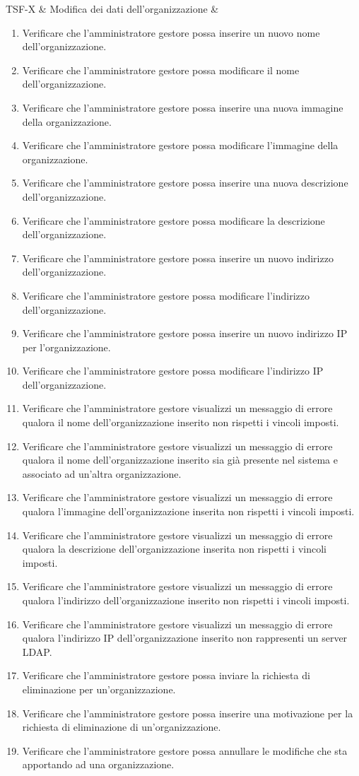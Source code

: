 TSF-X & Modifica dei dati dell'organizzazione & \begin{enumerate}
\item Verificare che l'amministratore gestore possa inserire un nuovo nome dell'organizzazione.
\item Verificare che l'amministratore gestore possa modificare il nome dell'organizzazione.
\item Verificare che l'amministratore gestore possa inserire una nuova immagine della organizzazione.
\item Verificare che l'amministratore gestore possa modificare l'immagine della organizzazione.
\item Verificare che l'amministratore gestore possa inserire una nuova descrizione dell’organizzazione.
\item Verificare che l'amministratore gestore possa modificare la descrizione dell’organizzazione.
\item Verificare che l'amministratore gestore possa inserire un nuovo indirizzo dell’organizzazione.
\item Verificare che l'amministratore gestore possa modificare l'indirizzo dell’organizzazione.
\item Verificare che l'amministratore gestore possa inserire un nuovo indirizzo IP per l'organizzazione.
\item Verificare che l'amministratore gestore possa modificare l'indirizzo IP dell'organizzazione.
\item Verificare che l'amministratore gestore visualizzi un messaggio di errore qualora il nome dell'organizzazione inserito non rispetti i vincoli imposti.
\item Verificare che l'amministratore gestore visualizzi un messaggio di errore qualora il nome dell'organizzazione inserito sia già presente nel sistema e associato ad un'altra organizzazione.
\item Verificare che l'amministratore gestore visualizzi un messaggio di errore qualora l'immagine dell'organizzazione inserita non rispetti i vincoli imposti.
\item Verificare che l'amministratore gestore visualizzi un messaggio di errore qualora la descrizione dell'organizzazione inserita non rispetti i vincoli imposti.
\item Verificare che l'amministratore gestore visualizzi un messaggio di errore qualora l'indirizzo dell'organizzazione inserito non rispetti i vincoli imposti.
\item Verificare che l'amministratore gestore visualizzi un messaggio di errore qualora l'indirizzo IP dell'organizzazione inserito non rappresenti un server LDAP.
\item Verificare che l'amministratore gestore possa inviare la richiesta di eliminazione per un'organizzazione.
\item Verificare che l'amministratore gestore possa inserire una motivazione per la richiesta di eliminazione di un'organizzazione.
\item Verificare che l'amministratore gestore possa annullare le modifiche che sta apportando ad una organizzazione.
\end{enumerate} \\
